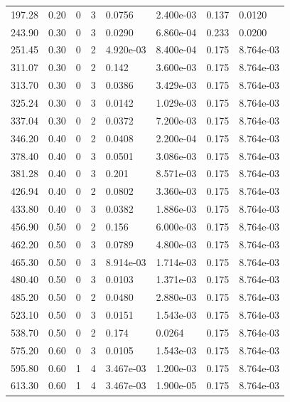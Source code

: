 \documentclass[preview]{standalone}
\begin{document}
{{\begin{tabular}{L{1.2cm}C{1.2cm} C{0.3cm}C{0.5cm} C{1.4cm}C{1.4cm} C{1.4cm}C{1.4cm}}
  197.28  &  0.20  & 0     &  3 &  0.0756  & 2.400e-03  & 0.137 &  0.0120   \\ 
  243.90  &  0.30  & 0     &  3 &  0.0290  & 6.860e-04  & 0.233 &  0.0200   \\ 
  251.45  &  0.30  & 0     &  2 &  4.920e-03  & 8.400e-04  & 0.175 &  8.764e-03   \\ 
  311.07  &  0.30  & 0     &  2 &  0.142  & 3.600e-03  & 0.175 &  8.764e-03   \\ 
  313.70  &  0.30  & 0     &  3 &  0.0386  & 3.429e-03  & 0.175 &  8.764e-03   \\ 
  325.24  &  0.30  & 0     &  3 &  0.0142  & 1.029e-03  & 0.175 &  8.764e-03   \\ 
  337.04  &  0.30  & 0     &  2 &  0.0372  & 7.200e-03  & 0.175 &  8.764e-03   \\ 
  346.20  &  0.40  & 0     &  2 &  0.0408  & 2.200e-04  & 0.175 &  8.764e-03   \\ 
  378.40  &  0.40  & 0     &  3 &  0.0501  & 3.086e-03  & 0.175 &  8.764e-03   \\ 
  381.28  &  0.40  & 0     &  3 &  0.201  & 8.571e-03  & 0.175 &  8.764e-03   \\ 
  426.94  &  0.40  & 0     &  2 &  0.0802  & 3.360e-03  & 0.175 &  8.764e-03   \\ 
  433.80  &  0.40  & 0     &  3 &  0.0382  & 1.886e-03  & 0.175 &  8.764e-03   \\ 
  456.90  &  0.50  & 0     &  2 &  0.156  & 6.000e-03  & 0.175 &  8.764e-03   \\ 
  462.20  &  0.50  & 0     &  3 &  0.0789  & 4.800e-03  & 0.175 &  8.764e-03   \\ 
  465.30  &  0.50  & 0     &  3 &  8.914e-03  & 1.714e-03  & 0.175 &  8.764e-03   \\ 
  480.40  &  0.50  & 0     &  3 &  0.0103  & 1.371e-03  & 0.175 &  8.764e-03   \\ 
  485.20  &  0.50  & 0     &  2 &  0.0480  & 2.880e-03  & 0.175 &  8.764e-03   \\ 
  523.10  &  0.50  & 0     &  3 &  0.0151  & 1.543e-03  & 0.175 &  8.764e-03   \\ 
  538.70  &  0.50  & 0     &  2 &  0.174  & 0.0264  & 0.175 &  8.764e-03   \\ 
  575.20  &  0.60  & 0     &  3 &  0.0105  & 1.543e-03  & 0.175 &  8.764e-03   \\ 
  595.80  &  0.60  & 1     &  4 &  3.467e-03  & 1.200e-03  & 0.175 &  8.764e-03   \\ 
  613.30  &  0.60  & 1     &  4 &  3.467e-03  & 1.900e-05  & 0.175 &  8.764e-03   \\ 

\end{tabular}}}
\end{document}
